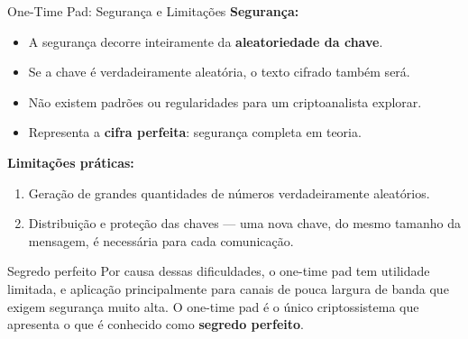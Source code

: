 \begin{frame}{One-Time Pad: Segurança e Limitações}
    \textbf{Segurança:}
    \begin{itemize}
        \item A segurança decorre inteiramente da \textbf{aleatoriedade da chave}.
        \item Se a chave é verdadeiramente aleatória, o texto cifrado também será.
        \item Não existem padrões ou regularidades para um criptoanalista explorar.
        \item Representa a \textbf{cifra perfeita}: segurança completa em teoria.
    \end{itemize}

    \medskip
    \textbf{Limitações práticas:}
    \begin{enumerate}
        \item Geração de grandes quantidades de números verdadeiramente aleatórios.
        \item Distribuição e proteção das chaves — uma nova chave, do mesmo tamanho da mensagem, é necessária para cada comunicação.
    \end{enumerate}

    \begin{block}{Segredo perfeito}
        Por causa dessas dificuldades, o one-time pad tem utilidade limitada, e aplicação principalmente para canais
        de pouca largura de banda que exigem segurança muito alta.
        O one-time pad é o único criptossistema que apresenta o que é conhecido como \textbf{segredo perfeito}.
    \end{block}
\end{frame}


